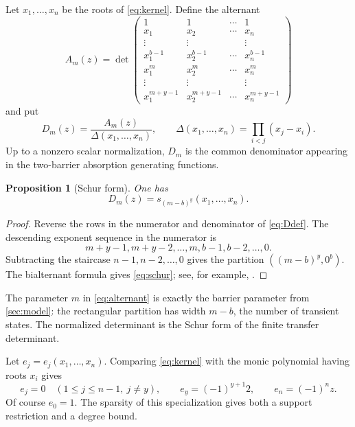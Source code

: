 \documentclass[11pt]{amsart}
\newtheorem{proposition}[theorem]{Proposition}
\theoremstyle{remark}
\begin{document}
Let $x_1,\ldots,x_n$ be the roots of \eqref{eq:kernel}.  Define the alternant
\begin{equation}\label{eq:alternant}
 A_m(z)=
 \det\!\begin{pmatrix}
 1&1&\cdots&1\\
 x_1&x_2&\cdots&x_n\\
 \vdots&\vdots&&\vdots\\
 x_1^{b-1}&x_2^{b-1}&\cdots&x_n^{b-1}\\
 x_1^m&x_2^m&\cdots&x_n^m\\
 \vdots&\vdots&&\vdots\\
 x_1^{m+y-1}&x_2^{m+y-1}&\cdots&x_n^{m+y-1}
 \end{pmatrix}
\end{equation}
and put
\begin{equation}\label{eq:Ddef}
    D_m(z)=\frac{A_m(z)}{\Delta(x_1,\ldots,x_n)},
    \qquad
    \Delta(x_1,\ldots,x_n)=\prod_{i<j}(x_j-x_i).
\end{equation}
Up to a nonzero scalar normalization, $D_m$ is the common denominator appearing in the two-barrier absorption generating functions.

\begin{proposition}[Schur form]\label{prop:schur}
One has
\begin{equation}\label{eq:schur}
    D_m(z)=s_{(m-b)^y}(x_1,\ldots,x_n).
\end{equation}
\end{proposition}

\begin{proof}
Reverse the rows in the numerator and denominator of \eqref{eq:Ddef}.  The descending exponent sequence in the numerator is
\[
    m+y-1,m+y-2,\ldots,m,b-1,b-2,\ldots,0.
\]
Subtracting the staircase $n-1,n-2,\ldots,0$ gives the partition $((m-b)^y,0^b)$.  The bialternant formula gives \eqref{eq:schur}; see, for example, \cite[Ch.~I]{Macdonald}.
\end{proof}

The parameter $m$ in \eqref{eq:alternant} is exactly the barrier parameter from \cref{sec:model}: the rectangular partition has width $m-b$, the number of transient states.  The normalized determinant is the Schur form of the finite transfer determinant.

Let $e_j=e_j(x_1,\ldots,x_n)$.  Comparing \eqref{eq:kernel} with the monic polynomial having roots $x_i$ gives
\begin{equation}\label{eq:especial}
 e_j=0\quad(1\leq j\leq n-1,\ j\neq y),
 \qquad
 e_y=(-1)^{y+1}2,
 \qquad
 e_n=(-1)^n z.
\end{equation}
Of course $e_0=1$.  The sparsity of this specialization gives both a support restriction and a degree bound.
\end{document}
